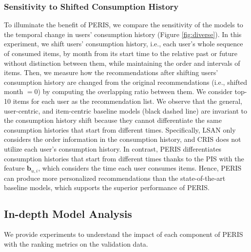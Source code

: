 \documentclass[sigconf]{acmart}
\newcommand{\MD}{{\small\textsf{PERIS}}}
\begin{document}
\subsubsection{\textbf{Sensitivity to Shifted Consumption History}}
To illuminate the benefit of \MD, we compare the sensitivity of the models to the temporal change in users' consumption history (Figure \ref{fig:diverse}). In this experiment, we shift users' consumption history, i.e., each user's whole sequence of consumed items, by month from its start time to the relative past or future without distinction between them, while maintaining the order and intervals of items. Then, we measure how the recommendations after shifting users' consumption history are changed from the original recommendations (i.e., shifted month $=0$) by computing the overlapping ratio between them. We consider top-10 items for each user  as the recommendation list. 
We observe that the general, user-centric, and item-centric baseline models (black dashed line) are invariant to the consumption history shift because they cannot differentiate the same consumption histories that start from different times. Specifically, LSAN only considers the order information in the consumption history, and CRIS does not utilize each user's consumption history.
In contrast, \MD{} differentiates consumption histories that start from different times thanks to the PIS with the feature $\textbf{b}_{u,i}$, which considers the time each user consumes items. Hence, \MD{} can produce more personalized recommendations than the state-of-the-art baseline models, which supports the superior performance of \MD{}. 


\subsection{In-depth Model Analysis}
We provide experiments to understand the impact of each component of \MD{} with the ranking metrics on the validation data. 
\end{document}
